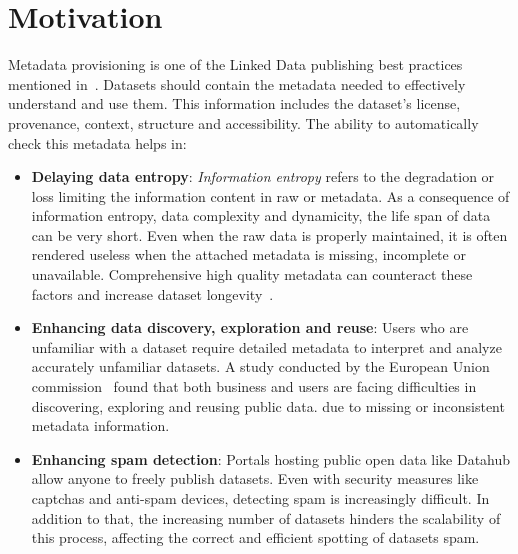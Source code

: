 \documentclass[runningheads,a4paper]{../../Util/LaTEX/llncs}
\begin{document}
\section{Motivation}
\label{sec:motivation}
Metadata provisioning is one of the Linked Data publishing best practices mentioned in~\cite{Bizer:DB:11}. Datasets should contain the metadata needed to effectively understand and use them. This information includes the dataset's license, provenance, context, structure and accessibility. The ability to automatically check this metadata helps in:
\begin{itemize}
  \item \textbf{Delaying data entropy}: \textit{Information entropy} refers to the degradation or loss limiting the information content in raw or metadata. As a consequence of information entropy, data complexity and dynamicity, the life span of data can be very short. Even when the raw data is properly maintained, it is often rendered useless when the attached metadata is missing, incomplete or unavailable. Comprehensive high quality metadata can counteract these factors and increase dataset longevity~\cite{Kovacs:GTOS:00}.
  \item \textbf{Enhancing data discovery, exploration and reuse}: Users who are unfamiliar with a dataset require detailed metadata to interpret and analyze accurately unfamiliar datasets. A study conducted by the European Union commission~\cite{Graham:TechReport:11} found that both business and users are facing difficulties in discovering, exploring and reusing public data. due to missing or inconsistent metadata information.
  \item \textbf{Enhancing spam detection}: Portals hosting public open data like Datahub allow anyone to freely publish datasets. Even with security measures like captchas and anti-spam devices, detecting spam is increasingly difficult. In addition to that, the increasing number of datasets hinders the scalability of this process, affecting the correct and efficient spotting of datasets spam.
\end{itemize}

\end{document}
